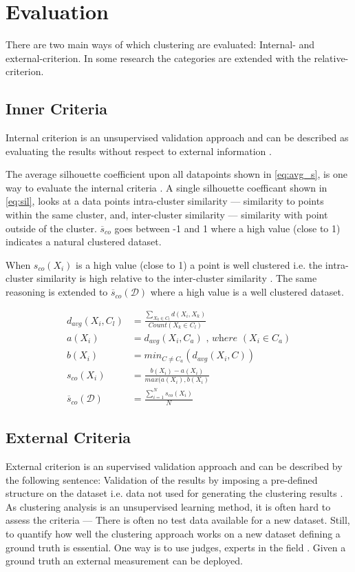 \documentclass[../report.tex]{subfiles}
\begin{document}
\newpage
\section{Evaluation}
There are two main ways of which clustering are evaluated: Internal- and external-criterion.\cite{manning2010introduction}
In some research the categories are extended with the relative-criterion.\cite{Halkidi2002}

\subsection{Inner Criteria} \label{sec:Internal}
Internal criterion is an unsupervised validation approach and can be described as evaluating the results without respect to external information \cite{Halkidi2002}.

The average silhouette coefficient upon all datapoints shown in \ref{eq:avg_s}, is one way to evaluate the internal criteria \cite{ROUSSEEUW198753}. A single silhouette coefficant shown in \ref{eq:sil}, looks at a data points intra-cluster similarity --- similarity to points within the same cluster, and, inter-cluster similarity --- similarity with point outside of the cluster. $\overline{s}_{co}$ goes between -1 and 1 where a high value (close to 1) indicates a natural clustered dataset.

When $s_{co}(X_i)$ is a high value (close to 1) a point is well clustered i.e. the intra-cluster similarity is high relative to the inter-cluster similarity \cite{ROUSSEEUW198753}
. The same reasoning is extended to $\overline{s}_{co}(\mathcal{D})$ where a high value is a well clustered dataset.

\begin{align}
  d_{avg}(X_i,C_l) &= \frac{\sum_{X_k \in C_l}d(X_i,X_k)}{Count(X_k \in C_l)} \\
  a(X_i) &= d_{avg}(X_i,C_a) \textit{ , where } (X_i \in C_a) \\
  b(X_i) &= min_{C \neq C_a}(d_{avg}(X_i,C)) \\
 \label{eq:sil}
  s_{co}(X_i) &= \frac{b(X_i) - a(X_i)}{max(a(X_i), b(X_i)} \\
\label{eq:avg_s}
  \overline{s}_{co}(\mathcal{D}) &= \frac{\sum^{N}_{i=1} s_{co}(X_i)}{N}
\end{align}


\subsection{External Criteria}
External criterion is an supervised validation approach and can be described by the following sentence: Validation of the results by imposing a pre-defined structure on the dataset i.e. data not used for generating the clustering results \cite{Halkidi2002}. As clustering analysis is an unsupervised learning method, it is often hard to assess the criteria --- There is often no test data available for a new dataset. Still, to quantify how well the clustering approach works on a new dataset defining a ground truth is essential. One way is to use judges, experts in the field \cite{manning2010introduction}. Given a ground truth an external measurement can be deployed.
\end{document}
